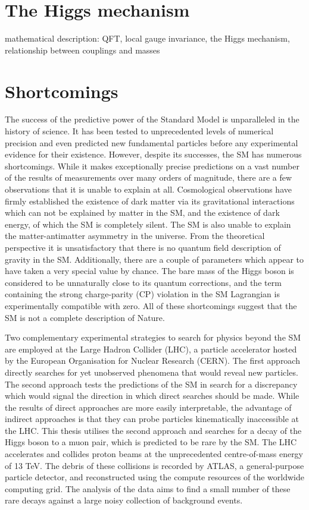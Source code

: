 \section{The Higgs mechanism}

mathematical description: QFT, local gauge invariance, the Higgs mechanism, relationship between couplings and masses

\section{Shortcomings}

The success
of the predictive power of the Standard Model is unparalleled in the history of science.
It has been tested to unprecedented levels of numerical precision and even predicted new
fundamental particles before any experimental evidence for their existence. However,
despite its successes, the SM has numerous shortcomings. While it makes exceptionally
precise predictions on a vast number of the results of measurements over many orders
of magnitude, there are a few observations that it is unable to explain at all.
Cosmological observations have firmly established the existence of dark matter via its
gravitational interactions which can not be explained by matter in the SM, and the
existence of dark energy, of which the SM is completely silent. The SM is also unable
to explain the matter-antimatter asymmetry in the universe. From the theoretical
perspective it is unsatisfactory that there is no quantum field description of gravity
in the SM. Additionally, there are a couple of parameters which appear to have taken a
very special value by chance. The bare mass of the Higgs boson is considered to be
unnaturally close to its quantum corrections, and the term containing the strong
charge-parity (CP) violation in the SM Lagrangian is experimentally compatible with
zero. All of these shortcomings suggest that the SM is not a complete description of Nature.


Two complementary experimental strategies to search for physics beyond the SM are
employed at the Large Hadron Collider (LHC), a particle accelerator hosted by the
European Organisation for Nuclear Research (CERN). The first approach directly searches
for yet unobserved phenomena that would reveal new particles. The second approach tests
the predictions of the SM in search for a discrepancy which would signal the direction
in which direct searches should be made. While the results of direct approaches are
more easily interpretable, the advantage of indirect approaches is that they can probe
particles kinematically inaccessible at the LHC. This thesis utilises the second
approach and searches for a decay of the Higgs boson to a muon pair, which is predicted
to be rare by the SM. The LHC accelerates and collides proton beams at the unprecedented
centre-of-mass energy of 13 TeV. The debris of these collisions is recorded by ATLAS, a
general-purpose particle detector, and reconstructed using the compute resources of the
worldwide computing grid. The analysis of the data aims to find a small number of these
rare decays against a large noisy collection of background events.





